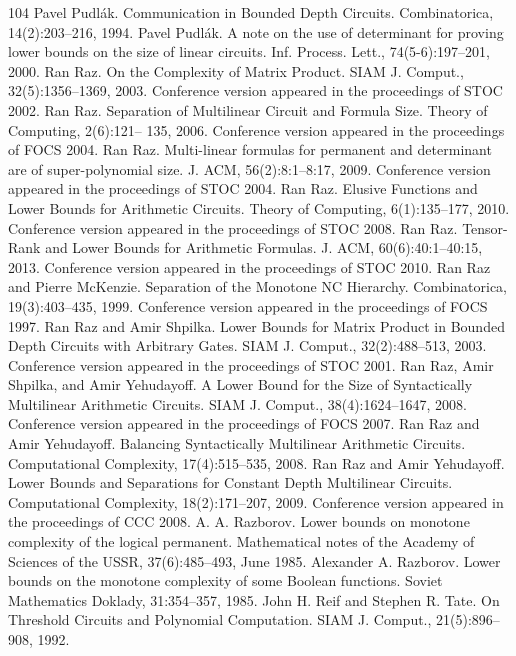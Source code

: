 \documentclass[10pt,a4paper]{article}
\begin{document}
\begin{thebibliography}{104}
 Pavel Pudlák. Communication in Bounded Depth Circuits. Combinatorica, 14(2):203–216, 1994.
 Pavel Pudlák. A note on the use of determinant for proving lower bounds on the size of linear circuits. Inf. Process. Lett., 74(5-6):197–201, 2000.
 Ran Raz. On the Complexity of Matrix Product. SIAM J. Comput., 32(5):1356–1369, 2003. Conference version appeared in the proceedings of STOC 2002.
 Ran Raz. Separation of Multilinear Circuit and Formula Size. Theory of Computing, 2(6):121– 135, 2006. Conference version appeared in the proceedings of FOCS 2004.
 Ran Raz. Multi-linear formulas for permanent and determinant are of super-polynomial size. J. ACM, 56(2):8:1–8:17, 2009. Conference version appeared in the proceedings of STOC 2004.
 Ran Raz. Elusive Functions and Lower Bounds for Arithmetic Circuits. Theory of Computing, 6(1):135–177, 2010. Conference version appeared in the proceedings of STOC 2008.
 Ran Raz. Tensor-Rank and Lower Bounds for Arithmetic Formulas. J. ACM, 60(6):40:1–40:15, 2013. Conference version appeared in the proceedings of STOC 2010.
 Ran Raz and Pierre McKenzie. Separation of the Monotone NC Hierarchy. Combinatorica, 19(3):403–435, 1999. Conference version appeared in the proceedings of FOCS 1997.
 Ran Raz and Amir Shpilka. Lower Bounds for Matrix Product in Bounded Depth Circuits with Arbitrary Gates. SIAM J. Comput., 32(2):488–513, 2003. Conference version appeared in the proceedings of STOC 2001.
 Ran Raz, Amir Shpilka, and Amir Yehudayoff. A Lower Bound for the Size of Syntactically Multilinear Arithmetic Circuits. SIAM J. Comput., 38(4):1624–1647, 2008. Conference version appeared in the proceedings of FOCS 2007.
 Ran Raz and Amir Yehudayoff. Balancing Syntactically Multilinear Arithmetic Circuits. Computational Complexity, 17(4):515–535, 2008.
 Ran Raz and Amir Yehudayoff. Lower Bounds and Separations for Constant Depth Multilinear Circuits. Computational Complexity, 18(2):171–207, 2009. Conference version appeared in the proceedings of CCC 2008.
 A. A. Razborov. Lower bounds on monotone complexity of the logical permanent. Mathematical notes of the Academy of Sciences of the USSR, 37(6):485–493, June 1985.
 Alexander A. Razborov. Lower bounds on the monotone complexity of some Boolean functions. Soviet Mathematics Doklady, 31:354–357, 1985.
 John H. Reif and Stephen R. Tate. On Threshold Circuits and Polynomial Computation. SIAM J. Comput., 21(5):896–908, 1992.

\end{thebibliography}
\end{document}
